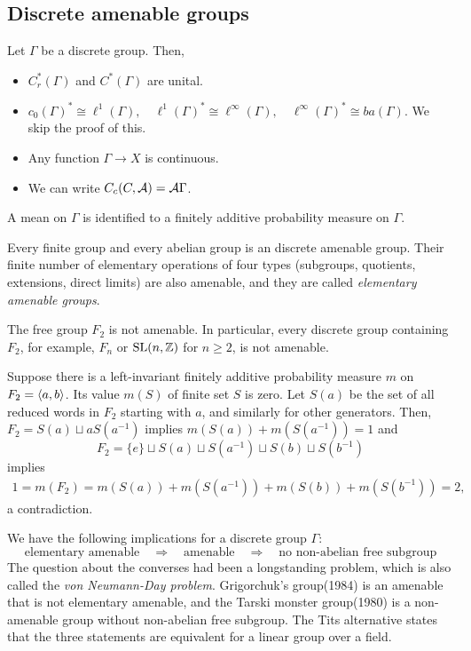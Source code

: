 \documentclass{../../small}
\begin{document}
\subsection{Discrete amenable groups}


Let $\Gamma$ be a discrete group.
Then,
\begin{itemize}
\item $C_r^*(\Gamma)$ and $C^*(\Gamma)$ are unital.
\item $c_0(\Gamma)^*\cong\ell^1(\Gamma),
\quad\ell^1(\Gamma)^*\cong\ell^\infty(\Gamma),
\quad\ell^\infty(\Gamma)^*\cong ba(\Gamma)$.
We skip the proof of this.
\item Any function $\Gamma\to X$ is continuous.
\item We can write $C_c(C,\mathcal{A})=\mathcal{A}\Gamma$.
\end{itemize}
A mean on $\Gamma$ is identified to a finitely additive probability measure on $\Gamma$.

\begin{ex}
\end{ex}

\begin{ex}
Every finite group and every abelian group is an discrete amenable group.
Their finite number of elementary operations of four types (subgroups, quotients, extensions, direct limits) are also amenable, and they are called \emph{elementary amenable groups}.
\end{ex}

\begin{ex}
The free group $F_2$ is not amenable.
In particular, every discrete group containing $F_2$, for example, $F_n$ or $\mathrm{SL}(n,\mathbb{Z})$ for $n\ge2$, is not amenable.
\end{ex}
\begin{pf}
Suppose there is a left-invariant finitely additive probability measure $m$ on $F_2=\langle a,b\rangle$.
Its value $m(S)$ of finite set $S$ is zero.
Let $S(a)$ be the set of all reduced words in $F_2$ starting with $a$, and similarly for other generators.
Then, $F_2=S(a)\sqcup aS(a^{-1})$ implies $m(S(a))+m(S(a^{-1}))=1$ and
\[F_2=\{e\}\sqcup S(a)\sqcup S(a^{-1})\sqcup S(b)\sqcup S(b^{-1})\]
implies
\begin{align*}
1=m(F_2)=m(S(a))+m(S(a^{-1}))+m(S(b))+m(S(b^{-1}))=2,
\end{align*}
a contradiction.
\end{pf}

\begin{rmk}
We have the following implications for a discrete group $\Gamma$:
\[\text{elementary amenable}\quad\Longrightarrow\quad\text{amenable}\quad\Longrightarrow\quad\text{no non-abelian free subgroup}\]
The question about the converses had been a longstanding problem, which is also called the \emph{von Neumann-Day problem}.
Grigorchuk's group(1984) is an amenable that is not elementary amenable, and the Tarski monster group(1980) is a non-amenable group without non-abelian free subgroup.
The Tits alternative states that the three statements are equivalent for a linear group over a field.
\end{rmk}
\end{document}
